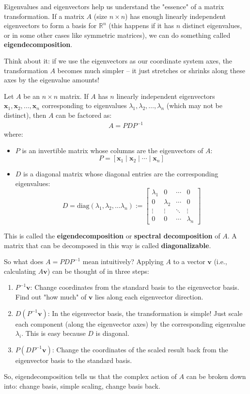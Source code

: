 \documentclass[11pt]{article}
\newcommand{\R}{\mathbb{R}}
\newcommand{\x}{\mathbf{x}}
\begin{document}
Eigenvalues and eigenvectors help us understand the "essence" of a matrix transformation. If a matrix $A$ (size $n \times n$) has enough linearly independent eigenvectors to form a basis for $\R^n$ (this happens if it has $n$ distinct eigenvalues, or in some other cases like symmetric matrices), we can do something called \textbf{eigendecomposition}.

Think about it: if we use the eigenvectors as our coordinate system axes, the transformation $A$ becomes much simpler – it just stretches or shrinks along these axes by the eigenvalue amounts!

\begin{theorem}[Eigendecomposition]
Let $A$ be an $n \times n$ matrix. If $A$ has $n$ linearly independent eigenvectors $\x_1, \x_2, \ldots, \x_n$ corresponding to eigenvalues $\lambda_1, \lambda_2, \ldots, \lambda_n$ (which may not be distinct), then $A$ can be factored as:
\begin{align} \label{eq:eigendecomp}
    A = P D P^{-1}
\end{align}
where:
\begin{itemize}
    \item $P$ is an invertible matrix whose columns are the eigenvectors of $A$:
    \[ P = [\x_1 \mid \x_2 \mid \cdots \mid \x_n] \]
    \item $D$ is a diagonal matrix whose diagonal entries are the corresponding eigenvalues:
    \[ D = \text{diag}(\lambda_1, \lambda_2, \dots \lambda_n) := \begin{bmatrix}
        \lambda_1 & 0 & \cdots & 0 \\
        0 & \lambda_2 & \cdots & 0 \\
        \vdots & \vdots & \ddots & \vdots \\
        0 & 0 & \cdots & \lambda_n
    \end{bmatrix} \]
\end{itemize}
This is called the \textbf{eigendecomposition} or \textbf{spectral decomposition} of $A$. A matrix that can be decomposed in this way is called \textbf{diagonalizable}.
\end{theorem}

So what does $A = PDP^{-1}$ mean intuitively? Applying $A$ to a vector $\mathbf{v}$ (i.e., calculating $A\mathbf{v}$) can be thought of in three steps:
\begin{enumerate}
    \item $P^{-1}\mathbf{v}$: Change coordinates from the standard basis to the eigenvector basis. Find out "how much" of $\mathbf{v}$ lies along each eigenvector direction.
    \item $D(P^{-1}\mathbf{v})$: In the eigenvector basis, the transformation is simple! Just scale each component (along the eigenvector axes) by the corresponding eigenvalue $\lambda_i$. This is easy because $D$ is diagonal.
    \item $P(D P^{-1}\mathbf{v})$: Change the coordinates of the scaled result back from the eigenvector basis to the standard basis.
\end{enumerate}
So, eigendecomposition tells us that the complex action of $A$ can be broken down into: change basis, simple scaling, change basis back.
\end{document}
